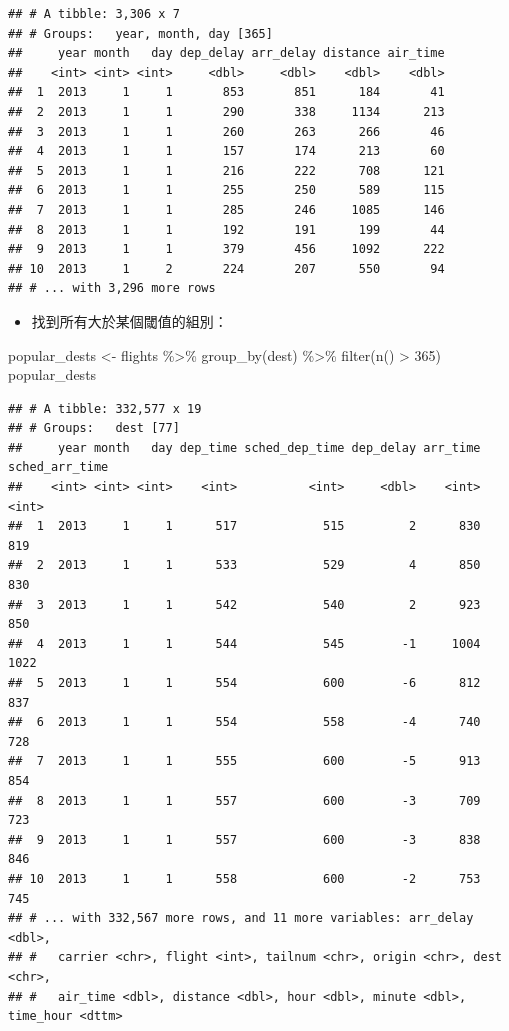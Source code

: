 \documentclass[
]{book}
\newenvironment{Shaded}{\begin{snugshade}}{\end{snugshade}}
\newcommand{\DecValTok}[1]{\textcolor[rgb]{0.00,0.00,0.81}{#1}}
\newcommand{\FunctionTok}[1]{\textcolor[rgb]{0.00,0.00,0.00}{#1}}
\newcommand{\NormalTok}[1]{#1}
\newcommand{\OtherTok}[1]{\textcolor[rgb]{0.56,0.35,0.01}{#1}}
\newcommand{\SpecialCharTok}[1]{\textcolor[rgb]{0.00,0.00,0.00}{#1}}
\providecommand{\tightlist}{%
  \setlength{\itemsep}{0pt}\setlength{\parskip}{0pt}}
\theoremstyle{definition}
\theoremstyle{remark}
\begin{document}
\begin{verbatim}
## # A tibble: 3,306 x 7
## # Groups:   year, month, day [365]
##     year month   day dep_delay arr_delay distance air_time
##    <int> <int> <int>     <dbl>     <dbl>    <dbl>    <dbl>
##  1  2013     1     1       853       851      184       41
##  2  2013     1     1       290       338     1134      213
##  3  2013     1     1       260       263      266       46
##  4  2013     1     1       157       174      213       60
##  5  2013     1     1       216       222      708      121
##  6  2013     1     1       255       250      589      115
##  7  2013     1     1       285       246     1085      146
##  8  2013     1     1       192       191      199       44
##  9  2013     1     1       379       456     1092      222
## 10  2013     1     2       224       207      550       94
## # ... with 3,296 more rows
\end{verbatim}

\begin{itemize}
\tightlist
\item
  找到所有大於某個閾值的組別：
\end{itemize}

\begin{Shaded}
\begin{Highlighting}[]
\NormalTok{popular\_dests }\OtherTok{\textless{}{-}}\NormalTok{ flights }\SpecialCharTok{\%\textgreater{}\%}
  \FunctionTok{group\_by}\NormalTok{(dest) }\SpecialCharTok{\%\textgreater{}\%}
  \FunctionTok{filter}\NormalTok{(}\FunctionTok{n}\NormalTok{() }\SpecialCharTok{\textgreater{}} \DecValTok{365}\NormalTok{)}
\NormalTok{popular\_dests}
\end{Highlighting}
\end{Shaded}

\begin{verbatim}
## # A tibble: 332,577 x 19
## # Groups:   dest [77]
##     year month   day dep_time sched_dep_time dep_delay arr_time sched_arr_time
##    <int> <int> <int>    <int>          <int>     <dbl>    <int>          <int>
##  1  2013     1     1      517            515         2      830            819
##  2  2013     1     1      533            529         4      850            830
##  3  2013     1     1      542            540         2      923            850
##  4  2013     1     1      544            545        -1     1004           1022
##  5  2013     1     1      554            600        -6      812            837
##  6  2013     1     1      554            558        -4      740            728
##  7  2013     1     1      555            600        -5      913            854
##  8  2013     1     1      557            600        -3      709            723
##  9  2013     1     1      557            600        -3      838            846
## 10  2013     1     1      558            600        -2      753            745
## # ... with 332,567 more rows, and 11 more variables: arr_delay <dbl>,
## #   carrier <chr>, flight <int>, tailnum <chr>, origin <chr>, dest <chr>,
## #   air_time <dbl>, distance <dbl>, hour <dbl>, minute <dbl>, time_hour <dttm>
\end{verbatim}
\end{document}

